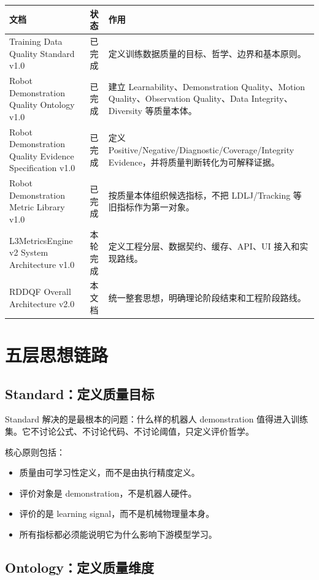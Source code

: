 \documentclass[UTF8,zihao=-4]{ctexart}
\begin{document}
\begin{longtable}{L{4.3cm} L{3cm} L{6.5cm}}
\toprule
文档 & 状态 & 作用 \\
\midrule
Training Data Quality Standard v1.0 & 已完成 & 定义训练数据质量的目标、哲学、边界和基本原则。 \\
Robot Demonstration Quality Ontology v1.0 & 已完成 & 建立 Learnability、Demonstration Quality、Motion Quality、Observation Quality、Data Integrity、Diversity 等质量本体。 \\
Robot Demonstration Quality Evidence Specification v1.0 & 已完成 & 定义 Positive/Negative/Diagnostic/Coverage/Integrity Evidence，并将质量判断转化为可解释证据。 \\
Robot Demonstration Metric Library v1.0 & 已完成 & 按质量本体组织候选指标，不把 LDLJ/Tracking 等旧指标作为第一对象。 \\
L3MetricsEngine v2 System Architecture v1.0 & 本轮完成 & 定义工程分层、数据契约、缓存、API、UI 接入和实现路线。 \\
RDDQF Overall Architecture v2.0 & 本文档 & 统一整套思想，明确理论阶段结束和工程阶段路线。 \\
\bottomrule
\end{longtable}

\section{五层思想链路}

\subsection{Standard：定义质量目标}

Standard 解决的是最根本的问题：什么样的机器人 demonstration 值得进入训练集。它不讨论公式、不讨论代码、不讨论阈值，只定义评价哲学。

核心原则包括：

\begin{itemize}
\item 质量由可学习性定义，而不是由执行精度定义。
\item 评价对象是 demonstration，不是机器人硬件。
\item 评价的是 learning signal，而不是机械物理量本身。
\item 所有指标都必须能说明它为什么影响下游模型学习。
\end{itemize}

\subsection{Ontology：定义质量维度}
\end{document}
